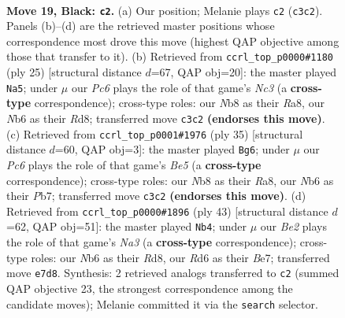 \documentclass[11pt]{article}
\begin{document}
\begin{figure}[p]
\label{fig:thought-m35}
\end{figure}

\clearpage

\begin{figure}[p]\centering
\begin{subfigure}{0.46\textwidth}\centering
\resizebox{\linewidth}{!}{%
\newchessgame
\chessboard[
  setfen={rnb3k1/1p2bpp1/pn1rp3/7p/8/1Pp1P1P1/P3P1BP/RNB1RK2 b - - 0 19},
  showmover=false,
  pgfstyle=straightmove, color=movearrow, markmove={c3-c2}
]}
\caption{}
\end{subfigure}\hfill
\begin{subfigure}{0.46\textwidth}\centering
\resizebox{\linewidth}{!}{%
\newchessgame
\chessboard[
  setfen={r2r2k1/pppb1pbp/2n3p1/4p3/8/1PN1PB2/PBPR1PPP/4K2R b K - 5 13},
  showmover=false,
  pgfstyle=straightmove, color=movearrow, markmove={c6-a5}
]}
\caption{}
\end{subfigure}
\\[4pt]
\begin{subfigure}{0.46\textwidth}\centering
\resizebox{\linewidth}{!}{%
\newchessgame
\chessboard[
  setfen={r5k1/1pp2ppp/2np4/p3r3/2P1b3/5PP1/PP1BP1BP/3RR1K1 b - - 0 18},
  showmover=false,
  pgfstyle=straightmove, color=movearrow, markmove={e4-g6}
]}
\caption{}
\end{subfigure}\hfill
\begin{subfigure}{0.46\textwidth}\centering
\resizebox{\linewidth}{!}{%
\newchessgame
\chessboard[
  setfen={3r2k1/p3bpp1/nr1pp2p/2p5/2P5/4P2P/PP1RBPPB/1R4K1 b - - 0 22},
  showmover=false,
  pgfstyle=straightmove, color=movearrow, markmove={a6-b4}
]}
\caption{}
\end{subfigure}
\caption{\textbf{Move 19, Black: \texttt{c2}.} (a) Our position; Melanie plays \texttt{c2} (\texttt{c3c2}). Panels (b)--(d) are the retrieved master positions whose correspondence most drove this move (highest QAP objective among those that transfer to it). (b) Retrieved from \texttt{ccrl\_top\_p0000\#1180} (ply 25) [structural distance $d$=67, QAP obj=20]: the master played \texttt{Na5}; under $\mu$ our \emph{Pc6} plays the role of that game's \emph{Nc3} (a \textbf{cross-type} correspondence); cross-type roles: our \emph{N}b8 as their \emph{R}a8, our \emph{N}b6 as their \emph{R}d8; transferred move \texttt{c3c2} \textbf{(endorses this move)}. (c) Retrieved from \texttt{ccrl\_top\_p0001\#1976} (ply 35) [structural distance $d$=60, QAP obj=3]: the master played \texttt{Bg6}; under $\mu$ our \emph{Pc6} plays the role of that game's \emph{Be5} (a \textbf{cross-type} correspondence); cross-type roles: our \emph{N}b8 as their \emph{R}a8, our \emph{N}b6 as their \emph{P}b7; transferred move \texttt{c3c2} \textbf{(endorses this move)}. (d) Retrieved from \texttt{ccrl\_top\_p0000\#1896} (ply 43) [structural distance $d$=62, QAP obj=51]: the master played \texttt{Nb4}; under $\mu$ our \emph{Be2} plays the role of that game's \emph{Na3} (a \textbf{cross-type} correspondence); cross-type roles: our \emph{N}b6 as their \emph{R}d8, our \emph{R}d6 as their \emph{B}e7; transferred move \texttt{e7d8}. Synthesis: 2 retrieved analogs transferred to \texttt{c2} (summed QAP objective 23, the strongest correspondence among the candidate moves); Melanie committed it via the \texttt{search} selector.}

\end{figure}
\end{document}
